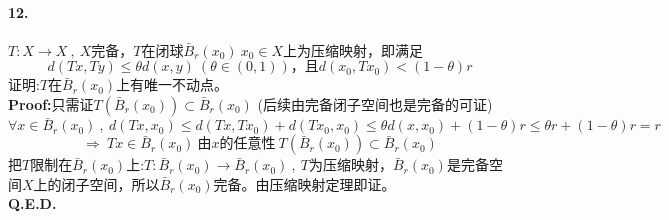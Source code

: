 \paragraph*{12.}$T:X \to X \ , \ X$完备，$T$在闭球$\bar{B}_r(x_0) \ x_0 \in X$上为压缩映射，即满足
\[d(Tx,Ty) \leq \theta d(x,y) \ (\theta \in (0,1))\text{，且}d(x_0,Tx_0)<(1-\theta)r\]
证明:$T$在$\bar{B}_r(x_0)$上有唯一不动点。\\
\textbf{Proof:}只需证$T(\bar{B}_r(x_0)) \subset \bar{B}_r(x_0)$ (后续由完备闭子空间也是完备的可证)
\[\forall x \in \bar{B}_r(x_0) \ , \ d(Tx,x_0) \leq d(Tx,Tx_0)+d(Tx_0,x_0) \leq \theta d(x,x_0)+(1-\theta)r \leq \theta r+(1-\theta)r=r\]
\[\Rightarrow \ Tx \in \bar{B}_r(x_0) \ \text{由}x\text{的任意性} \ T(\bar{B}_r(x_0)) \subset \bar{B}_r(x_0)\]
把$T$限制在$\bar{B}_r(x_0)$上:$T:\bar{B}_r(x_0) \to \bar{B}_r(x_0) \ , \ T$为压缩映射，$\bar{B}_r(x_0)$是完备空间$X$上的闭子空间，所以$\bar{B}_r(x_0)$完备。由压缩映射定理即证。\\
\textbf{Q.E.D.}

